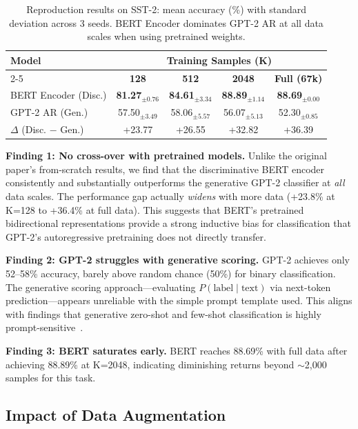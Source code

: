 \documentclass[11pt,a4paper]{article}
\begin{document}
\begin{table}[H]
\centering
\small
\begin{tabular}{lcccc}
\toprule
\multirow{2}{*}{\textbf{Model}} & \multicolumn{4}{c}{\textbf{Training Samples (K)}} \\
\cmidrule(lr){2-5}
 & \textbf{128} & \textbf{512} & \textbf{2048} & \textbf{Full (67k)} \\
\midrule
BERT Encoder (Disc.) & \textbf{81.27}$_{\pm0.76}$ & \textbf{84.61}$_{\pm3.34}$ & \textbf{88.89}$_{\pm1.14}$ & \textbf{88.69}$_{\pm0.00}$ \\
GPT-2 AR (Gen.)      & 57.50$_{\pm3.49}$ & 58.06$_{\pm5.57}$ & 56.07$_{\pm5.13}$ & 52.30$_{\pm0.85}$ \\
\midrule
$\Delta$ (Disc. $-$ Gen.) & +23.77 & +26.55 & +32.82 & +36.39 \\
\bottomrule
\end{tabular}
\caption{Reproduction results on SST-2: mean accuracy (\%) with standard deviation across 3 seeds. BERT Encoder dominates GPT-2 AR at all data scales when using pretrained weights.}
\label{tab:reproduction}
\end{table}

\textbf{Finding 1: No cross-over with pretrained models.} Unlike the original paper's from-scratch results, we find that the discriminative BERT encoder consistently and substantially outperforms the generative GPT-2 classifier at \textit{all} data scales. The performance gap actually \textit{widens} with more data (+23.8\% at K=128 to +36.4\% at full data). This suggests that BERT's pretrained bidirectional representations provide a strong inductive bias for classification that GPT-2's autoregressive pretraining does not directly transfer.

\textbf{Finding 2: GPT-2 struggles with generative scoring.} GPT-2 achieves only 52--58\% accuracy, barely above random chance (50\%) for binary classification. The generative scoring approach---evaluating $P(\text{label} \mid \text{text})$ via next-token prediction---appears unreliable with the simple prompt template used. This aligns with findings that generative zero-shot and few-shot classification is highly prompt-sensitive~\cite{zhao2021calibrate}.

\textbf{Finding 3: BERT saturates early.} BERT reaches 88.69\% with full data after achieving 88.89\% at K=2048, indicating diminishing returns beyond $\sim$2,000 samples for this task.

\subsection{Impact of Data Augmentation}
\end{document}
